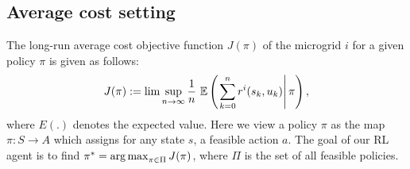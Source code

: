 \subsection{Average cost setting} \label{subsec:avg}
The long-run average cost objective function $J(\pi)$ of the microgrid $i$ for a given policy $\pi$ is given as follows:
\begin{align}
J(\pi) := \lim \sup_{n \rightarrow \infty}\frac{1}{n} \,\, \mathbb{E} \left(\left.\sum_{k = 0}^{n} r^{i} (s_{k},u_{k})\right|\pi \right),
\end{align}
where $E(.)$ denotes the expected value. Here we view a policy $\pi$ as the map $\pi : S \to A$ which assigns for any state $s$, a feasible action $a$. The goal of our RL agent is to find $\pi^* = \mathop{\rm arg\,max}_{\pi \in \Pi} J(\pi)$, where $\Pi$ is the set of all feasible policies.

%
%

